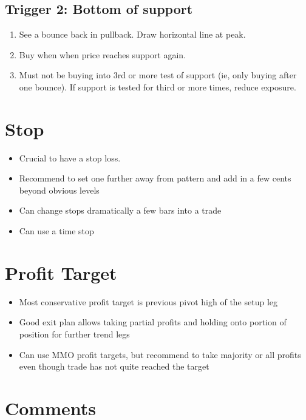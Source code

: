\documentclass{../notes}
\begin{document}
\subsection{Trigger 2: Bottom of support}
\begin{enumerate}
  \item See a bounce back in pullback. Draw horizontal line at peak.
  \item Buy when when price reaches support again.
  \item Must not be buying into 3rd or more test of support (ie, only buying after one bounce). If support is tested for third or more times, reduce exposure.
\end{enumerate}
\section{Stop}
\begin{itemize}
  \item Crucial to have a stop loss.
  \item Recommend to set one further away from pattern and add in a few cents beyond obvious levels
  \item Can change stops dramatically a few bars into a trade
  \item Can use a time stop
\end{itemize}
\section{Profit Target}
\begin{itemize}
  \item Most conservative profit target is previous pivot high of the setup leg
  \item Good exit plan allows taking partial profits and holding onto portion of position for further trend legs
  \item Can use MMO profit targets, but recommend to take majority or all profits even though trade has not quite reached the target
\end{itemize}
\section{Comments}
\end{document}
